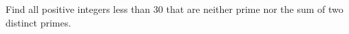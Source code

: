 Find all positive integers less than $30$ that are neither prime nor the sum of two distinct primes.
